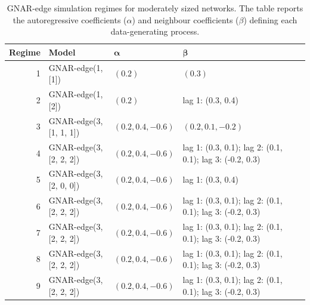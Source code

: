 \begin{table}
\caption{GNAR-edge simulation regimes for moderately sized networks. The table reports the autoregressive coefficients ($\alpha$) and neighbour coefficients ($\beta$) defining each data-generating process.}
\label{tab:gnar_regimes}
\begin{tabular}{rlll}
\toprule
Regime & Model & $\boldsymbol{\alpha}$ & $\boldsymbol{\beta}$ \\
\midrule
1 & GNAR-edge(1, [1]) & $(0.2)$ & $(0.3)$ \\
2 & GNAR-edge(1, [2]) & $(0.2)$ & lag 1: (0.3, 0.4) \\
3 & GNAR-edge(3, [1, 1, 1]) & $(0.2, 0.4, -0.6)$ & $(0.2, 0.1, -0.2)$ \\
4 & GNAR-edge(3, [2, 2, 2]) & $(0.2, 0.4, -0.6)$ & lag 1: (0.3, 0.1); lag 2: (0.1, 0.1); lag 3: (-0.2, 0.3) \\
5 & GNAR-edge(3, [2, 0, 0]) & $(0.2, 0.4, -0.6)$ & lag 1: (0.3, 0.4) \\
6 & GNAR-edge(3, [2, 2, 2]) & $(0.2, 0.4, -0.6)$ & lag 1: (0.3, 0.1); lag 2: (0.1, 0.1); lag 3: (-0.2, 0.3) \\
7 & GNAR-edge(3, [2, 2, 2]) & $(0.2, 0.4, -0.6)$ & lag 1: (0.3, 0.1); lag 2: (0.1, 0.1); lag 3: (-0.2, 0.3) \\
8 & GNAR-edge(3, [2, 2, 2]) & $(0.2, 0.4, -0.6)$ & lag 1: (0.3, 0.1); lag 2: (0.1, 0.1); lag 3: (-0.2, 0.3) \\
9 & GNAR-edge(3, [2, 2, 2]) & $(0.2, 0.4, -0.6)$ & lag 1: (0.3, 0.1); lag 2: (0.1, 0.1); lag 3: (-0.2, 0.3) \\
\bottomrule
\end{tabular}
\end{table}
